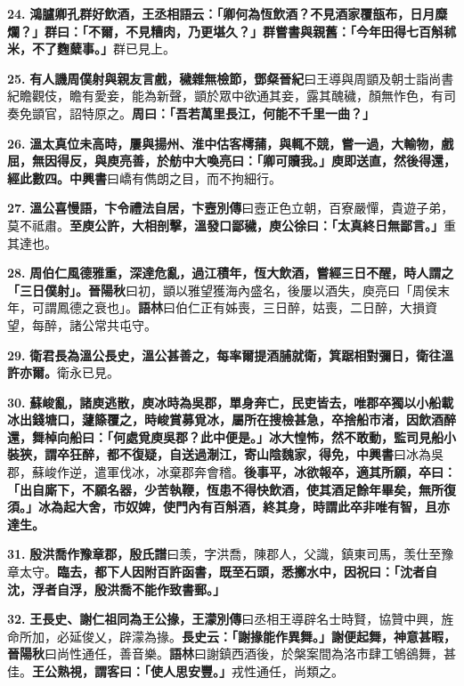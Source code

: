 \textbf{24.} \textbf{鴻臚卿孔群好飲酒，王丞相語云：「卿何為恆飲酒？不見酒家覆瓿布，日月糜爛？」群曰：「不爾，不見糟肉，乃更堪久？」群嘗書與親舊：「今年田得七百斛秫米，不了麴糵事。」}{\footnotesize 群已見上。}

\textbf{25.} \textbf{有人譏周僕射與親友言戲，穢雜無檢節，}{\footnotesize \textbf{鄧粲晉紀}曰王導與周顗及朝士詣尚書紀瞻觀伎，瞻有愛妾，能為新聲，顗於眾中欲通其妾，露其醜穢，顏無怍色，有司奏免顗官，詔特原之。}\textbf{周曰：「吾若萬里長江，何能不千里一曲？」}

\textbf{26.} \textbf{溫太真位未高時，屢與揚州、淮中估客樗蒱，與輒不競，嘗一過，大輸物，戲屈，無因得反，與庾亮善，於舫中大喚亮曰：「卿可贖我。」庾即送直，然後得還，經此數四。}{\footnotesize \textbf{中興書}曰嶠有儁朗之目，而不拘細行。}

\textbf{27.} \textbf{溫公喜慢語，卞令禮法自居，}{\footnotesize \textbf{卞壼別傳}曰壼正色立朝，百寮嚴憚，貴遊子弟，莫不祗肅。}\textbf{至庾公許，大相剖擊，溫發口鄙穢，庾公徐曰：「太真終日無鄙言。」}{\footnotesize 重其達也。}

\textbf{28.} \textbf{周伯仁風德雅重，深達危亂，過江積年，恆大飲酒，嘗經三日不醒，時人謂之「三日僕射」。}{\footnotesize \textbf{晉陽秋}曰初，顗以雅望獲海內盛名，後屢以酒失，庾亮曰「周侯末年，可謂鳳德之衰也」。\textbf{語林}曰伯仁正有姊喪，三日醉，姑喪，二日醉，大損資望，每醉，諸公常共屯守。}

\textbf{29.} \textbf{衛君長為溫公長史，溫公甚善之，每率爾提酒脯就衛，箕踞相對彌日，衛往溫許亦爾。}{\footnotesize 衛永已見。}

\textbf{30.} \textbf{蘇峻亂，諸庾逃散，庾冰時為吳郡，單身奔亡，民吏皆去，唯郡卒獨以小船載冰出錢塘口，蘧篨覆之，時峻賞募覓冰，屬所在搜檢甚急，卒捨船市渚，因飲酒醉還，舞棹向船曰：「何處覓庾吳郡？此中便是。」冰大惶怖，然不敢動，監司見船小裝狹，謂卒狂醉，都不復疑，自送過淛江，寄山陰魏家，得免，}{\footnotesize \textbf{中興書}曰冰為吳郡，蘇峻作逆，遣軍伐冰，冰棄郡奔會稽。}\textbf{後事平，冰欲報卒，適其所願，卒曰：「出自廝下，不願名器，少苦執鞭，恆患不得快飲酒，使其酒足餘年畢矣，無所復須。」冰為起大舍，市奴婢，使門內有百斛酒，終其身，時謂此卒非唯有智，且亦達生。}

\textbf{31.} \textbf{殷洪喬作豫章郡，}{\footnotesize \textbf{殷氏譜}曰羡，字洪喬，陳郡人，父識，鎮東司馬，羡仕至豫章太守。}\textbf{臨去，都下人因附百許函書，既至石頭，悉擲水中，因祝曰：「沈者自沈，浮者自浮，殷洪喬不能作致書郵。」}

\textbf{32.} \textbf{王長史、謝仁祖同為王公掾，}{\footnotesize \textbf{王濛別傳}曰丞相王導辟名士時賢，協贊中興，旌命所加，必延俊乂，辟濛為掾。}\textbf{長史云：「謝掾能作異舞。」謝便起舞，神意甚暇，}{\footnotesize \textbf{晉陽秋}曰尚性通任，善音樂。\textbf{語林}曰謝鎮西酒後，於槃案間為洛市肆工鴝鵒舞，甚佳。}\textbf{王公熟視，謂客曰：「使人思安豐。」}{\footnotesize 戎性通任，尚類之。}

